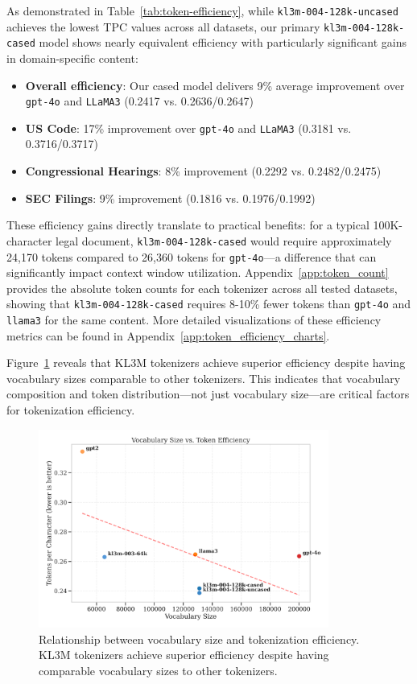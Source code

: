 As demonstrated in Table~\ref{tab:token-efficiency}, while \texttt{kl3m-004-128k-uncased} achieves the lowest TPC values across all datasets, our primary \texttt{kl3m-004-128k-cased} model shows nearly equivalent efficiency with particularly significant gains in domain-specific content:

\begin{itemize}
    \item \textbf{Overall efficiency}: Our cased model delivers 9\% average improvement over \texttt{gpt-4o} and \texttt{LLaMA3} (0.2417 vs. 0.2636/0.2647)
    \item \textbf{US Code}: 17\% improvement over \texttt{gpt-4o} and \texttt{LLaMA3} (0.3181 vs. 0.3716/0.3717)
    \item \textbf{Congressional Hearings}: 8\% improvement (0.2292 vs. 0.2482/0.2475)
    \item \textbf{SEC Filings}: 9\% improvement (0.1816 vs. 0.1976/0.1992)
\end{itemize}

These efficiency gains directly translate to practical benefits: for a typical 100K-character legal document, \texttt{kl3m-004-128k-cased} would require approximately 24,170 tokens compared to 26,360 tokens for \texttt{gpt-4o}—a difference that can significantly impact context window utilization. Appendix~\ref{app:token_count} provides the absolute token counts for each tokenizer across all tested datasets, showing that \texttt{kl3m-004-128k-cased} requires 8-10\% fewer tokens than \texttt{gpt-4o} and \texttt{llama3} for the same content. More detailed visualizations of these efficiency metrics can be found in Appendix~\ref{app:token_efficiency_charts}.

Figure~\ref{fig:vocab_size_vs_efficiency} reveals that KL3M tokenizers achieve superior efficiency despite having vocabulary sizes comparable to other tokenizers. This indicates that vocabulary composition and token distribution—not just vocabulary size—are critical factors for tokenization efficiency.

\begin{figure}[htbp]
    \centering
    \includegraphics[width=0.85\textwidth]{figures/vocab_size_vs_efficiency.png}
    \caption{Relationship between vocabulary size and tokenization efficiency. KL3M tokenizers achieve superior efficiency despite having comparable vocabulary sizes to other tokenizers.}
    \label{fig:vocab_size_vs_efficiency}
\end{figure}

